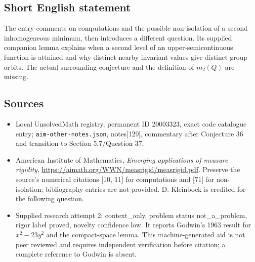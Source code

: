 \documentclass[11pt]{article}
\begin{document}
\subsection{Short English statement}
The entry comments on computations and the possible non-isolation of a second inhomogeneous minimum, then introduces a different question. Its supplied companion lemma explains when a second level of an upper-semicontinuous function is attained and why distinct nearby invariant values give distinct group orbits. The actual surrounding conjecture and the definition of $m_2(Q)$ are missing.
\subsection{Sources}
\begin{itemize}
\item Local UnsolvedMath registry, permanent ID 20003323, exact code catalogue entry; \texttt{aim-other-notes.json}, notes[129], commentary after Conjecture 36 and transition to Section 5.7/Question 37.
\item American Institute of Mathematics, \emph{Emerging applications of measure rigidity}, \url{https://aimath.org/WWN/measrigid/measrigid.pdf}. Preserve the source's numerical citations [10, 11] for computations and [71] for non-isolation; bibliography entries are not provided. D. Kleinbock is credited for the following question.
\item Supplied research attempt 2: context\_only, problem status not\_a\_problem, rigor label proved, novelty confidence low. It reports Godwin's 1963 result for $x^2-23y^2$ and the compact-space lemma. This machine-generated aid is not peer reviewed and requires independent verification before citation; a complete reference to Godwin is absent.
\end{itemize}
\end{document}
